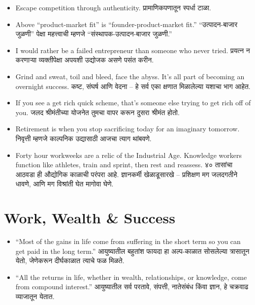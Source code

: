 \begin{itemize}
  \item Escape competition through authenticity. प्रामाणिकपणातून स्पर्धा टाळा.

  \item Above ``product-market fit'' is ``founder-product-market fit.'' ``उत्पादन-बाजार जुळणी'' पेक्षा महत्त्वाची म्हणजे ``संस्थापक-उत्पादन-बाजार जुळणी.''

  \item I would rather be a failed entrepreneur than someone who never tried. प्रयत्न न करणाऱ्या व्यक्तीपेक्षा अपयशी उद्योजक असणे पसंत करीन.

  \item Grind and sweat, toil and bleed, face the abyss. It’s all part of becoming an overnight success. कष्ट, संघर्ष आणि वेदना – हे सर्व एका क्षणात मिळालेल्या यशाचा भाग आहेत.

  \item If you see a get rich quick scheme, that’s someone else trying to get rich off of you. जलद श्रीमंतीच्या योजनेत तुमचा वापर करून दुसरा श्रीमंत होतो.

  \item Retirement is when you stop sacrificing today for an imaginary tomorrow. निवृत्ती म्हणजे काल्पनिक उद्यासाठी आजचा त्याग थांबवणे.

  \item Forty hour workweeks are a relic of the Industrial Age. Knowledge workers function like athletes, train and sprint, then rest and reassess. ४० तासांचा आठवडा ही औद्योगिक काळाची परंपरा आहे. ज्ञानकर्मी खेळाडूसारखे – प्रशिक्षण मग जलदगतीने धावणे, आणि मग विश्रांती घेत मागोवा घेणे. 
\end{itemize}


\section*{Work, Wealth \& Success}
\begin{itemize}
    \item ``Most of the gains in life come from suffering in the short term so you can get paid in the long term.'' आयुष्यातील बहुतांश फायदा हा अल्प-काळात सोसलेल्या त्रासातून येतो, जेणेकरून दीर्घकाळात त्याचे फळ मिळते.

    \item ``All the returns in life, whether in wealth, relationships, or knowledge, come from compound interest.'' 
आयुष्यातील सर्व परतावे, संपत्ती, नातेसंबंध किंवा ज्ञान, हे चक्रवाढ व्याजातून येतात.
\end{itemize}

